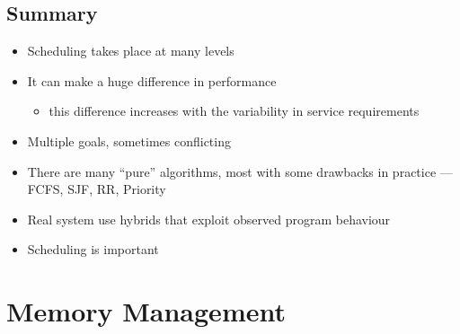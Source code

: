 \documentclass[11pt,a4paper]{article}
\begin{document}
\subsection{Summary}
\begin{itemize}
    \item Scheduling takes place at many levels
    \item It can make a huge difference in performance
        \begin{itemize}
            \item this difference increases with the variability in service requirements
        \end{itemize}
    \item Multiple goals, sometimes conflicting
    \item There are many ``pure'' algorithms, most with some drawbacks in practice ---
        FCFS, SJF, RR, Priority
    \item Real system use hybrids that exploit observed program behaviour
    \item Scheduling is important
\end{itemize}

\section{Memory Management}
\end{document}
